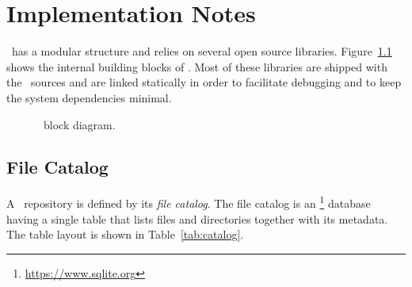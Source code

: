 \chapter{Implementation Notes}

\cvmfs\ has a modular structure and relies on several open source libraries.
Figure~\ref{fig:cvmfsblocks} shows the internal building blocks of \cvmfs.
Most of these libraries are shipped with the \cvmfs\ sources and are linked statically in order to facilitate debugging and to keep the system dependencies minimal.

\begin{figure}
	\begin{center}
		
	\end{center}
	\caption{\cvmfs\ block diagram.}
	\label{fig:cvmfsblocks}
\end{figure}


\section{File Catalog}

A \cvmfs\ repository is defined by its \emph{file catalog}.
The file catalog is an \sqlite\footnote{\url{https://www.sqlite.org}} database~\cite{sqlite10} having a single table that lists files and directories together with its metadata.
The table layout is shown in Table~\ref{tab:catalog}.

